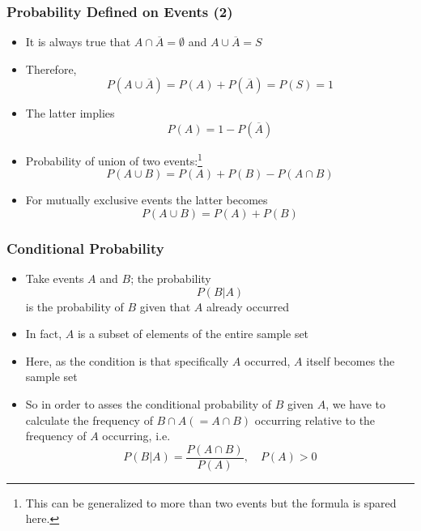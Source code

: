 \documentclass[10pt]{beamer}
\theoremstyle{definition}
\begin{document}
\begin{frame}[fragile]
\frametitle{Probability Defined on Events (2)}
\begin{itemize}
	\item It is always true that $ A \cap \overline{A} = \emptyset $ and $ A \cup \overline{A} = S $
		
	\item Therefore,
	\[
		P(A \cup \overline{A}) = P(A) + P(\overline{A}) = P(S) = 1 
	\]
	
	\item The latter implies
	\[
		P(A) = 1 - P(\overline{A})
	\]
		
	\item Probability of union of two events:\footnote{This can be generalized to more than two events but the formula is spared here.}
	\[
		P(A \cup B) = P(A) + P(B) - P(A\cap B)
	\]
		
	\item For mutually exclusive events the latter becomes
	\[
		P(A \cup B) = P(A) + P(B)
	\]
		
\end{itemize}
\end{frame}

\begin{frame}[fragile]
\frametitle{Conditional Probability}
\begin{itemize}
	\item Take events $ A $ and $ B $; the probability
	\[
		P(B|A)
	\]
	is the probability of $ B $ given that $ A $ already occurred
	
	\item In fact, $ A $ is a subset of elements of the entire sample set
	
	\item Here, as the condition is that specifically $ A $ occurred, $ A $ itself becomes the sample set
	
	\item So in order to asses the conditional probability of $ B $ given $ A $, we have to calculate the frequency of $ B \cap A (= A\cap B) $ occurring relative to the frequency of $ A $ occurring, i.e.
	\[
		P(B|A)  = \dfrac{P(A \cap B)}{P(A)}, \quad P(A) > 0
	\]
\end{itemize}
\end{frame}
\end{document}

